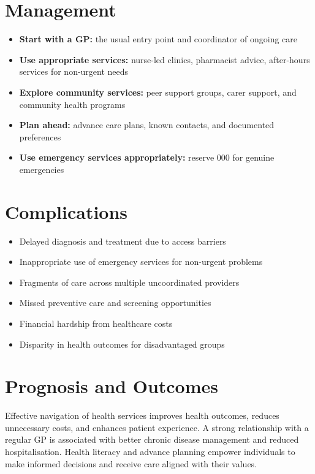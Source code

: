 \section*{Management}
\begin{itemize}
    \item \textbf{Start with a GP:} the usual entry point and coordinator of ongoing care
    \item \textbf{Use appropriate services:} nurse-led clinics, pharmacist advice, after-hours services for non-urgent needs
    \item \textbf{Explore community services:} peer support groups, carer support, and community health programs
    \item \textbf{Plan ahead:} advance care plans, known contacts, and documented preferences
    \item \textbf{Use emergency services appropriately:} reserve 000 for genuine emergencies
\end{itemize}

\section*{Complications}
\begin{itemize}
    \item Delayed diagnosis and treatment due to access barriers
    \item Inappropriate use of emergency services for non-urgent problems
    \item Fragments of care across multiple uncoordinated providers
    \item Missed preventive care and screening opportunities
    \item Financial hardship from healthcare costs
    \item Disparity in health outcomes for disadvantaged groups
\end{itemize}

\section*{Prognosis and Outcomes}
Effective navigation of health services improves health outcomes, reduces unnecessary costs, and enhances patient experience. A strong relationship with a regular GP is associated with better chronic disease management and reduced hospitalisation. Health literacy and advance planning empower individuals to make informed decisions and receive care aligned with their values.

